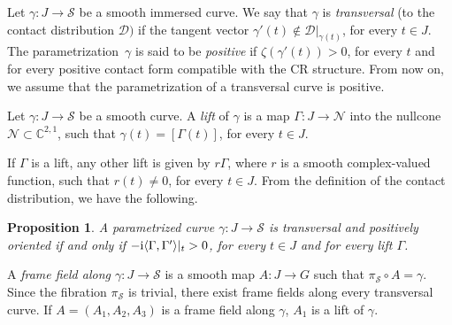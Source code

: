 \documentclass[pdftex]{sigma}
\numberwithin{equation}{section}
\newtheorem{Proposition}[Theorem]{Proposition}
 { \theoremstyle{definition}
\newtheorem{Definition}[Theorem]{Definition}
\newtheorem{Note}[Theorem]{Note}
\newtheorem{Example}[Theorem]{Example}
\newtheorem{Remark}[Theorem]{Remark} }
\def\C{\mathbb{C}}
\def\S{\mathcal{S}}
\def\S{\mathcal{S}}
\begin{document}
\begin{Definition}
Let $\gamma \colon J \to\S$ be a smooth immersed curve. We say that $\gamma$ is \emph{transversal} (to the contact
distribution $\mathcal{D})$ if the tangent vector ${\gamma'}(t) \not\in \mathcal{D}|_{\gamma(t)}$, for every $t \in J$.
The parametrization~$\gamma$ is said to be
\emph{positive} if $\zeta({\gamma'}(t) ) > 0$, for every $t$ and for every positive contact form compatible
with the CR structure.
From now on, we assume that the parametrization of a transversal curve is positive.
\end{Definition}


\begin{Definition}
Let $\gamma\colon J \to\S$ be a smooth curve.
A \emph{lift} of $\gamma$ is a map $\Gamma\colon J \to \mathcal{N}$ into the nullcone $\mathcal{N}\subset\C^{2,1}$,
such that $\gamma(t) = [\Gamma(t)]$, for every $t \in J$.
 \end{Definition}

If $\Gamma$ is a lift, any other lift is given by $r\Gamma$, where $r$ is a smooth complex-valued function,
such that $r(t)\neq 0$, for every $t \in J$.
 From the definition of the contact distribution, we have the following.

 \begin{Proposition}
 A parametrized curve $\gamma \colon J \to\S$ is transversal
 and positively oriented if and only if
 $- {\rm i}\langle \Gamma,\Gamma'\rangle|_t > 0$, for every $t\in J$ and for every lift $\Gamma$.
 \end{Proposition}

\begin{Definition}
A \emph{frame field along $\gamma \colon J \to \S$} is a smooth map $A \colon J \to {G}$
%
such that ${\pi_\S \circ A = \gamma}$. Since the fibration $\pi_{\mathcal{S}}$
is trivial, there exist frame fields along every transversal curve.
If $A=(A_1,A_2,A_3)$ is a frame field along $\gamma$, $A_1$ is a lift of $\gamma$.
\end{Definition}
\end{document}
